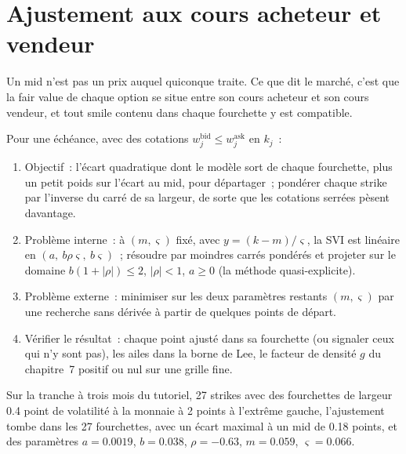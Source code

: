 \section{Ajustement aux cours acheteur et vendeur}

Un mid n'est pas un prix auquel quiconque traite. Ce que dit le marché, c'est que la fair value de chaque
option se situe entre son cours acheteur et son cours vendeur, et tout smile contenu dans chaque fourchette y est compatible.

\begin{method}\label{met:dv:parametrising-the-surface:fit}
Pour une échéance, avec des cotations $w^{\mathrm{bid}}_j\le w^{\mathrm{ask}}_j$ en $k_j$~:
\begin{enumerate}
\item Objectif~: l'écart quadratique dont le modèle sort de chaque fourchette, plus un petit poids sur
l'écart au mid, pour départager~; pondérer chaque strike par l'inverse du carré de sa largeur, de sorte
que les cotations serrées pèsent davantage.
\item Problème interne~: à $(m,\varsigma)$ fixé, avec $y=(k-m)/\varsigma$, la SVI est linéaire en
$(a,\ b\rho\varsigma,\ b\varsigma)$~; résoudre par moindres carrés pondérés et projeter sur le domaine
$b(1+|\rho|)\le2$, $|\rho|<1$, $a\ge0$ (la méthode quasi-explicite).
\item Problème externe~: minimiser sur les deux paramètres restants $(m,\varsigma)$ par une recherche sans dérivée
à partir de quelques points de départ.
\item Vérifier le résultat~: chaque point ajusté dans sa fourchette (ou signaler ceux qui n'y sont pas), les ailes dans
la borne de Lee, le facteur de densité $g$ du chapitre~7 positif ou nul sur une grille fine.
\end{enumerate}
\end{method}

Sur la tranche à trois mois du tutoriel, 27 strikes avec des fourchettes de largeur 0.4 point de
volatilité à la monnaie à 2 points à l'extrême gauche, l'ajustement tombe dans les 27 fourchettes, avec un écart maximal à un mid
de 0.18 points, et des paramètres $a=0.0019$, $b=0.038$, $\rho=-0.63$, $m=0.059$, $\varsigma=0.066$.

